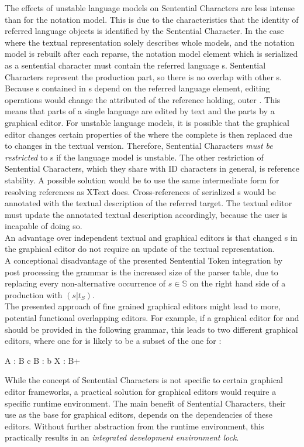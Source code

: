 The effects of unstable language models on Sentential Characters are less intense than for the notation model. This is due to the characteristics that the identity of referred language objects is identified by the Sentential Character. In the case where the textual representation solely describes whole models, and the notation model is rebuilt after each reparse, the notation model element which is serialized as a sentential character must contain the referred language s. Sentential Characters represent the production part, so there is no overlap with other s. Because s contained in s depend on the referred language element, editing operations would change the attributed  of the reference holding, outer . This means that parts of a single language  are edited by text and the parts by a graphical editor. For unstable language models, it is possible that the graphical editor changes certain properties of the  where the complete  is then replaced due to changes in the textual version. Therefore, Sentential Characters \emph{must be restricted }to s if the language model is unstable. The other restriction of Sentential Characters, which they share with ID characters in general, is reference stability. A possible solution would be to use the same intermediate form for resolving references as XText does. Cross-references of serialized s would be annotated with the textual description of the referred target. The textual editor must update the annotated textual description accordingly, because the user is incapable of doing so. \\
An advantage over independent textual and graphical editors is that changed s in the graphical editor do not require an update of the textual representation.\\
A conceptional disadvantage of the presented Sentential Token integration by post processing the grammar is the increased size of the parser table, due to replacing every non-alternative occurrence of $s \in \mathbb{S}$ on the right hand side of a production with $(s | t_S)$. \\
The presented approach of fine grained graphical editors might lead to more, potential functional overlapping editors. For example, if a graphical editor for  and  should be provided in the following grammar, this leads to two different graphical editors, where one for  is likely to be a subset of the one for :
\begin{xtxt}
A : B c
B : b
X : B+
\end{xtxt}
While the concept of Sentential Characters is not specific to certain graphical editor frameworks, a practical solution for graphical editors would require a specific runtime environment. The main benefit of Sentential Characters, their use as the base for graphical editors, depends on the dependencies of these editors. Without further abstraction from the runtime environment, this practically results in an \emph{integrated development environment lock}.

